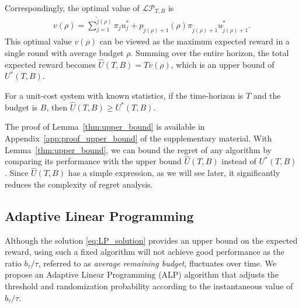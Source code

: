 Correspondingly, the optimal value of  $\mathcal{LP}_{T,B}$ is
\begin{eqnarray}\label{eq:LP_single_step_value}
{v}(\rho) = \sum_{j =1}^{ \tilde{j}(\rho)} \pi_j u_j^*
+ p_{\tilde{j}(\rho) + 1}(\rho) \pi_{\tilde{j}(\rho) + 1} u_{\tilde{j}(\rho) + 1}^*.
\end{eqnarray}
This optimal value ${v}(\rho)$ can be viewed as the maximum expected reward in a single round with average budget $\rho$.
Summing over the entire horizon, the total expected reward becomes $\widehat{U}(T,B) = T{v}(\rho)$, which is an upper bound of $U^*(T,B)$.
\begin{lemma}\label{thm:upper_bound}
For a unit-cost system with known statistics, if the time-horizon is $T$ and the budget is $B$,
then  $\widehat{U}(T,B) \geq U^*(T,B)$.
\end{lemma}

The proof of Lemma~\ref{thm:upper_bound} is available in Appendix~\ref{app:proof_upper_bound} of the supplementary material. With Lemma~\ref{thm:upper_bound}, we can bound the regret of any algorithm by comparing its performance
with the upper bound $\widehat{U}(T,B)$  instead of $U^*(T,B)$.
Since $\widehat{U}(T,B)$ has a simple expression,
as we will see later, it significantly reduces the complexity of regret analysis.

\subsection{Adaptive Linear Programming} \label{subsec:adaptive_lp}
Although the solution \eqref{eq:LP_solution} provides an upper bound on the expected reward,
using such a fixed algorithm will not achieve good performance as the ratio $b_{\tau}/\tau$, referred to as {\emph{average remaining budget}},
 fluctuates over time.
We propose an Adaptive Linear Programming (ALP) algorithm that adjusts the threshold and randomization probability according to the
instantaneous value of $b_{\tau}/\tau$.

